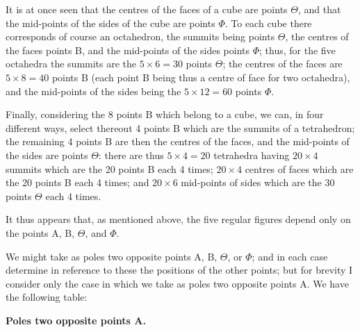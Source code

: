 \documentclass[12pt,a4paper]{article}
\theoremstyle{cayley}
\theoremstyle{definition}
\numberwithin{equation}{section}
\begin{document}
It is at once seen that the centres of the faces of a cube are points $\Theta$, and that the mid-points of the sides of the cube are points $\Phi$. To each cube there corresponds of course an octahedron, the summits being points $\Theta$, the centres of the faces points B, and the mid-points of the sides points $\Phi$; thus, for the five octahedra the summits are the $5 \times 6 = 30$ points $\Theta$; the centres of the faces are $5 \times 8 = 40$ points B (each point B being thus a centre of face for two octahedra), and the mid-points of the sides being the $5 \times 12 = 60$ points $\Phi$.

Finally, considering the 8 points B which belong to a cube, we can, in four different ways, select thereout 4 points B which are the summits of a tetrahedron; the remaining 4 points B are then the centres of the faces, and the mid-points of the sides are points $\Theta$: there are thus $5 \times 4 = 20$ tetrahedra having $20 \times 4$ summits which are the 20 points B each 4 times; $20 \times 4$ centres of faces which are the 20 points B each 4 times; and $20 \times 6$ mid-points of sides which are the 30 points $\Theta$ each 4 times.

It thus appears that, as mentioned above, the five regular figures depend only on the points A, B, $\Theta$, and $\Phi$.

We might take as poles two opposite points A, B, $\Theta$, or $\Phi$; and in each case determine in reference to these the positions of the other points; but for brevity I consider only the case in which we take as poles two opposite points A. We have the following table:

\begin{center}
\textbf{Poles two opposite points A.}
\end{center}
\end{document}
